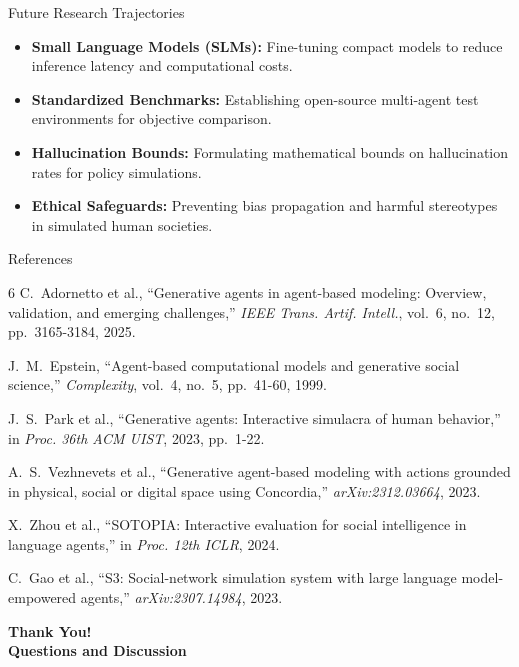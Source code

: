 \documentclass{beamer}
\begin{document}
\begin{frame}{Future Research Trajectories}
\begin{itemize}
    \item \textbf{Small Language Models (SLMs):} Fine-tuning compact models to reduce inference latency and computational costs.
    \medskip
    \item \textbf{Standardized Benchmarks:} Establishing open-source multi-agent test environments for objective comparison.
    \medskip
    \item \textbf{Hallucination Bounds:} Formulating mathematical bounds on hallucination rates for policy simulations.
    \medskip
    \item \textbf{Ethical Safeguards:} Preventing bias propagation and harmful stereotypes in simulated human societies.
\end{itemize}
\end{frame}

\begin{frame}{References}
\scriptsize
\begin{thebibliography}{6}
C.~Adornetto et al., ``Generative agents in agent-based modeling: Overview, validation, and emerging challenges,'' \textit{IEEE Trans. Artif. Intell.}, vol.~6, no.~12, pp.~3165-3184, 2025.

J.~M.~Epstein, ``Agent-based computational models and generative social science,'' \textit{Complexity}, vol.~4, no.~5, pp.~41-60, 1999.

J.~S.~Park et al., ``Generative agents: Interactive simulacra of human behavior,'' in \textit{Proc. 36th ACM UIST}, 2023, pp.~1-22.

A.~S.~Vezhnevets et al., ``Generative agent-based modeling with actions grounded in physical, social or digital space using Concordia,'' \textit{arXiv:2312.03664}, 2023.

X.~Zhou et al., ``SOTOPIA: Interactive evaluation for social intelligence in language agents,'' in \textit{Proc. 12th ICLR}, 2024.

C.~Gao et al., ``S3: Social-network simulation system with large language model-empowered agents,'' \textit{arXiv:2307.14984}, 2023.
\end{thebibliography}
\end{frame}

\begin{frame}
\centering
\vspace{1.5cm}
\Huge{\textbf{Thank You!}} \\[0.8cm]
\Large{\textbf{Questions and Discussion}} \\[1.0cm]
\end{frame}
\end{document}
